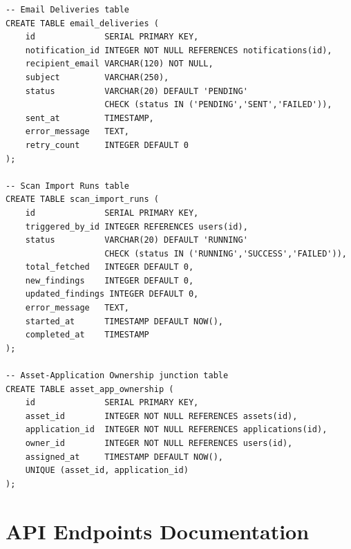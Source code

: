 \begin{lstlisting}[style=sql, caption={Complete VMS Database Schema}, label={lst:fullsql}]
-- Email Deliveries table
CREATE TABLE email_deliveries (
    id              SERIAL PRIMARY KEY,
    notification_id INTEGER NOT NULL REFERENCES notifications(id),
    recipient_email VARCHAR(120) NOT NULL,
    subject         VARCHAR(250),
    status          VARCHAR(20) DEFAULT 'PENDING'
                    CHECK (status IN ('PENDING','SENT','FAILED')),
    sent_at         TIMESTAMP,
    error_message   TEXT,
    retry_count     INTEGER DEFAULT 0
);

-- Scan Import Runs table
CREATE TABLE scan_import_runs (
    id              SERIAL PRIMARY KEY,
    triggered_by_id INTEGER REFERENCES users(id),
    status          VARCHAR(20) DEFAULT 'RUNNING'
                    CHECK (status IN ('RUNNING','SUCCESS','FAILED')),
    total_fetched   INTEGER DEFAULT 0,
    new_findings    INTEGER DEFAULT 0,
    updated_findings INTEGER DEFAULT 0,
    error_message   TEXT,
    started_at      TIMESTAMP DEFAULT NOW(),
    completed_at    TIMESTAMP
);

-- Asset-Application Ownership junction table
CREATE TABLE asset_app_ownership (
    id              SERIAL PRIMARY KEY,
    asset_id        INTEGER NOT NULL REFERENCES assets(id),
    application_id  INTEGER NOT NULL REFERENCES applications(id),
    owner_id        INTEGER NOT NULL REFERENCES users(id),
    assigned_at     TIMESTAMP DEFAULT NOW(),
    UNIQUE (asset_id, application_id)
);
\end{lstlisting}

\chapter{API Endpoints Documentation}
\label{app:api}

